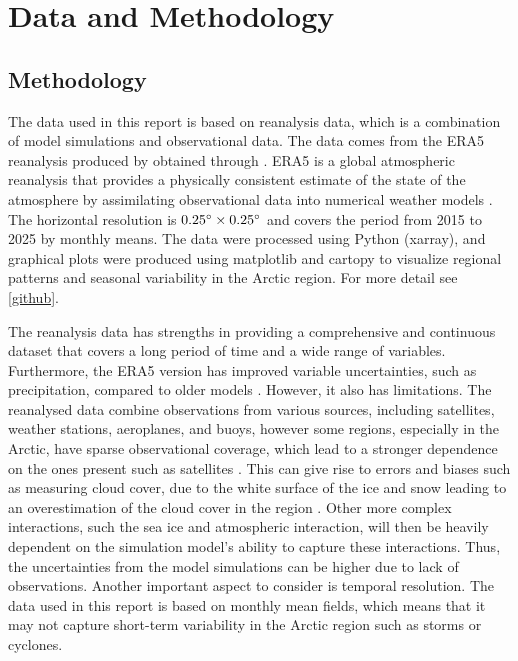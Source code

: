 \section{Data and Methodology}


\subsection{Methodology}
The data used in this report is based on reanalysis data, which is a combination of model simulations and observational data. The data comes from the ERA5 reanalysis produced by obtained through \citet{copernicus_climate_change_service_era5_2023}. ERA5 is a global atmospheric reanalysis that provides a physically consistent estimate of the state of the atmosphere by assimilating observational data into numerical weather models \citep{hersbach2020}. The horizontal resolution is $0.25\text{$\text{}^\circ$} \times 0.25\text{$\text{}^\circ$}$ and covers the period from 2015 to 2025 by monthly means. The data were processed using Python (xarray), and graphical plots were produced using matplotlib and cartopy to visualize regional patterns and seasonal variability in the Arctic region. For more detail see \autoref{github}. 


The reanalysis data has strengths in providing a comprehensive and continuous dataset that covers a long period of time and a wide range of variables. Furthermore, the ERA5 version has improved variable uncertainties, such as precipitation, compared to older models \cite{hersbach2020}. However, it also has limitations. The reanalysed data combine observations from various sources, including satellites, weather stations, aeroplanes, and buoys, however some regions, especially in the Arctic, have sparse observational coverage, which lead to a stronger dependence on the ones present such as satellites \citep{hersbach2020}. This can give rise to errors and biases such as measuring cloud cover, due to the white surface of the ice and snow leading to an overestimation of the cloud cover in the region \citep{hersbach2020}. Other more complex interactions, such the sea ice and atmospheric interaction, will then be heavily dependent on the simulation model's ability to capture these interactions. Thus, the uncertainties from the model simulations can be higher due to lack of observations. Another important aspect to consider is temporal resolution. The data used in this report is based on monthly mean fields, which means that it may not capture short-term variability in the Arctic region such as storms or cyclones. 



